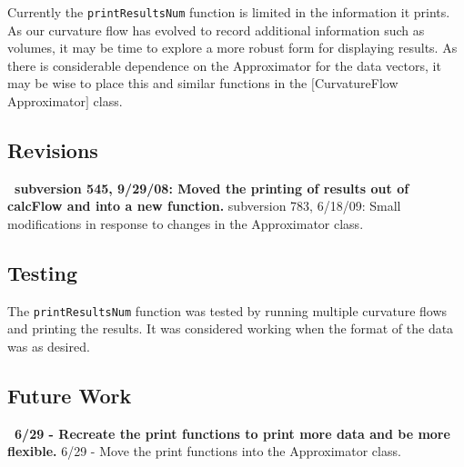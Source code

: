 Currently the \texttt{printResultsNum} function is limited in the
information it prints. As our curvature flow has evolved to record
additional information such as volumes, it may be time to explore a more
robust form for displaying results. As there is considerable dependence on
the Approximator for the data vectors, it may be wise to place this and
similar functions in the \mbox{$[$}CurvatureFlow Approximator\mbox{$]$}
class.

\subsection*{Revisions}

\textbf{\ subversion 545, 9/29/08: Moved the printing of results out of
calcFlow and into a new function. }  subversion 783, 6/18/09: Small
modifications in response to changes in the Approximator class.

\subsection*{Testing}

The \texttt{printResultsNum} function was tested by running multiple
curvature flows and printing the results. It was considered working when the
format of the data was as desired.

\subsection*{Future Work}

\textbf{\ 6/29 - Recreate the print functions to print more data and be more
flexible.}  6/29 - Move the print functions into the Approximator class.


%
